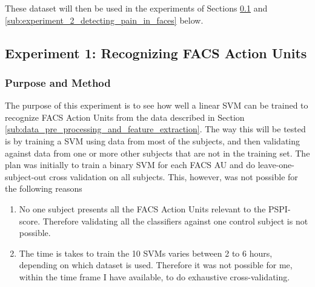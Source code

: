 \documentclass[Main]{subfiles}
\begin{document}
			These dataset will then be used in the experiments of Sections \ref{sub:experiment_1_recognizing_facs_action_units} and \ref{sub:experiment_2_detecting_pain_in_faces} below.
			
		

	\subsection{Experiment 1: Recognizing FACS Action Units} %
		\label{sub:experiment_1_recognizing_facs_action_units}
		\subsubsection{Purpose and Method} %
			\label{ssub:purpose_and_method_ex1}
			The purpose of this experiment is to see how well a linear SVM can be trained to recognize FACS Action Units from the data described in Section \ref{sub:data_pre_processing_and_feature_extraction}.
			The way this will be tested is by training a SVM using data from most of the subjects, and then validating against data from one or more other subjects that are not in the training set.
			The plan was initially to train a binary SVM for each FACS AU and do leave-one-subject-out cross validation on all subjects.
			This, however, was not possible for the following reasons
			\begin{enumerate}
				\item
				No one subject presents all the FACS Action Units relevant to the PSPI-score.
				Therefore validating all the classifiers against one control subject is not possible.

				\item
				The time is takes to train the 10 SVMs varies between 2 to 6 hours, depending on which dataset is used.
				Therefore it was not possible for me, within the time frame I have available, to do exhaustive cross-validating.
			\end{enumerate}
\end{document}
